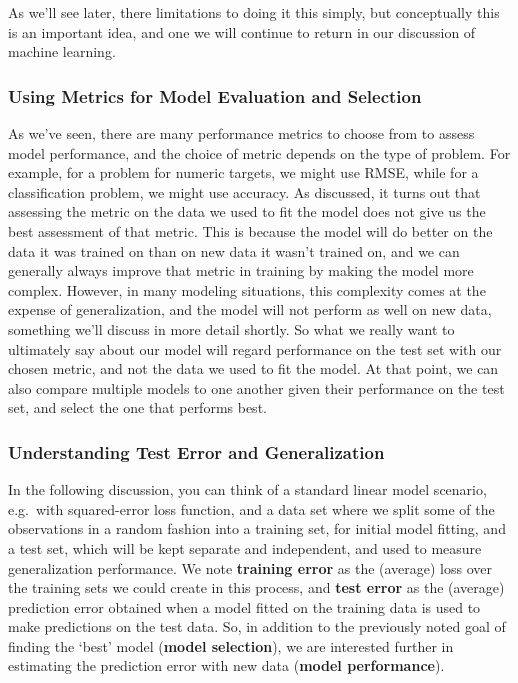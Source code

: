 \documentclass[
  letterpaper,
]{krantz}
\begin{document}
As we'll see later, there limitations to doing it this simply, but
conceptually this is an important idea, and one we will continue to
return in our discussion of machine learning.

\subsubsection{Using Metrics for Model Evaluation and
Selection}\label{using-metrics-for-model-evaluation-and-selection}

As we've seen, there are many performance metrics to choose from to
assess model performance, and the choice of metric depends on the type
of problem. For example, for a problem for numeric targets, we might use
RMSE, while for a classification problem, we might use accuracy. As
discussed, it turns out that assessing the metric on the data we used to
fit the model does not give us the best assessment of that metric. This
is because the model will do better on the data it was trained on than
on new data it wasn't trained on, and we can generally always improve
that metric in training by making the model more complex. However, in
many modeling situations, this complexity comes at the expense of
generalization, and the model will not perform as well on new data,
something we'll discuss in more detail shortly. So what we really want
to ultimately say about our model will regard performance on the test
set with our chosen metric, and not the data we used to fit the model.
At that point, we can also compare multiple models to one another given
their performance on the test set, and select the one that performs
best.

\subsubsection{Understanding Test Error and
Generalization}\label{understanding-test-error-and-generalization}

In the following discussion, you can think of a standard linear model
scenario, e.g.~with squared-error loss function, and a data set where we
split some of the observations in a random fashion into a training set,
for initial model fitting, and a test set, which will be kept separate
and independent, and used to measure generalization performance. We note
\textbf{training error} as the (average) loss over the training sets we
could create in this process, and \textbf{test error} as the (average)
prediction error obtained when a model fitted on the training data is
used to make predictions on the test data. So, in addition to the
previously noted goal of finding the `best' model (\textbf{model
selection}), we are interested further in estimating the prediction
error with new data (\textbf{model performance}).
\end{document}
